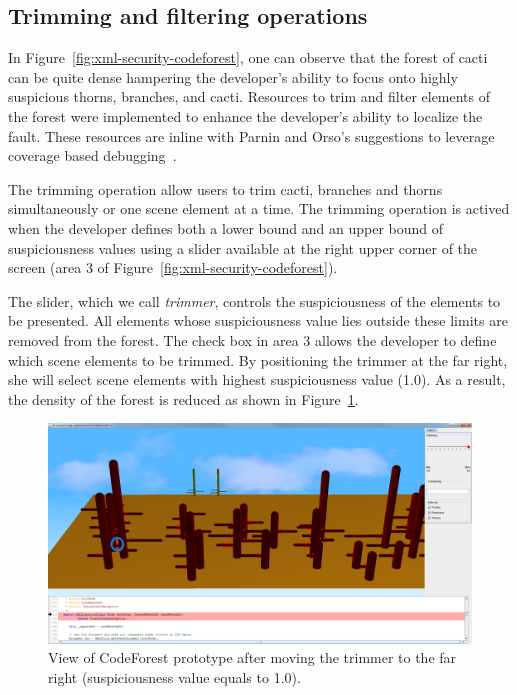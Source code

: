 \subsection{Trimming and filtering operations}

In Figure~\ref{fig:xml-security-codeforest}, one can observe that the forest of
cacti can be quite dense hampering the developer's ability to focus onto highly
suspicious thorns, branches, and cacti. Resources  to trim and filter elements
of the forest were implemented to enhance the developer's ability to localize
the fault.  These resources are inline with Parnin and Orso's suggestions to
leverage coverage based debugging~\cite{parnin2011automated}.

The trimming operation allow users to trim cacti, branches and thorns
simultaneously or one scene element at a time. The trimming operation is actived
when the developer defines both a lower bound and an upper bound of 
suspiciousness values using a slider available at the right upper corner of the
screen (area 3 of Figure~\ref{fig:xml-security-codeforest}).

The slider, which we call \textit{trimmer}, controls the suspiciousness  of the
elements to be presented. All elements whose suspiciousness value lies outside
these limits are removed from the forest.  The check box in area 3 allows the
developer to define which scene elements to be trimmed.  By positioning the
trimmer at the far right, she will  select scene elements with highest
suspiciousness value (1.0). As a result, the density of the forest is reduced as
shown in Figure~\ref{fig:xml-security-trimmed}.

\begin{figure}
  \centering
    \includegraphics[width=\linewidth]{figures/fig-cf-example-04-alt}
  \caption{View of CodeForest prototype after moving the trimmer to the far right (suspiciousness value equals to 1.0).}
  \label{fig:xml-security-trimmed}
\end{figure}


